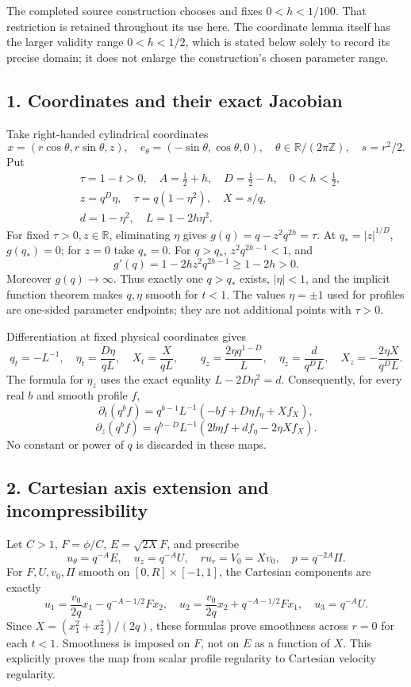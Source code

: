 \documentclass[10pt,a4paper]{article}
\begin{document}
The completed source construction chooses and fixes \(0<h<1/100\). That restriction is retained throughout its use here. The coordinate lemma itself has the larger validity range \(0<h<1/2\), which is stated below solely to record its precise domain; it does not enlarge the construction's chosen parameter range.

\subsection{1. Coordinates and their exact Jacobian}

Take right-handed cylindrical coordinates
\[
x=(r\cos\theta,r\sin\theta,z),\quad e_\theta=(-\sin\theta,\cos\theta,0),
\quad \theta\in\mathbb R/(2\pi\mathbb Z),\quad s=r^2/2.
\]
Put
\[
\begin{aligned}
&\tau=1-t>0,\quad A=\tfrac12+h,\quad D=\tfrac12-h,\quad 0<h<\tfrac12,\\
&z=q^D\eta,\quad \tau=q(1-\eta^2),\quad X=s/q,\\
&d=1-\eta^2,\quad L=1-2h\eta^2.
\end{aligned}
\]
For fixed \(\tau>0,z\in\mathbb R\), eliminating \(\eta\) gives
\(g(q)=q-z^2q^{2h}=\tau\). At \(q_*=|z|^{1/D}\), \(g(q_*)=0\); for \(z=0\) take \(q_*=0\). For \(q>q_*\), \(z^2q^{2h-1}<1\), and
\[
g'(q)=1-2hz^2q^{2h-1}\ge1-2h>0.
\]
Moreover \(g(q)\to\infty\). Thus exactly one \(q>q_*\) exists, \(|\eta|<1\), and the implicit function theorem makes \(q,\eta\) smooth for \(t<1\). The values \(\eta=\pm1\) used for profiles are one-sided parameter endpoints; they are not additional points with \(\tau>0\).

Differentiation at fixed physical coordinates gives
\[
q_t=-L^{-1},\quad \eta_t=\frac{D\eta}{qL},\quad X_t=\frac X{qL},
\qquad q_z=\frac{2\eta q^{1-D}}L,
\quad \eta_z=\frac d{q^DL},\quad X_z=-\frac{2\eta X}{q^DL}.
\]
The formula for \(\eta_z\) uses the exact equality \(L-2D\eta^2=d\). Consequently, for every real \(b\) and smooth profile \(f\),
\[
\partial_t(q^bf)=q^{b-1}L^{-1}(-bf+D\eta f_\eta+Xf_X),
\]
\[
\partial_z(q^bf)=q^{b-D}L^{-1}(2b\eta f+df_\eta-2\eta Xf_X).
\]
No constant or power of \(q\) is discarded in these maps.

\subsection{2. Cartesian axis extension and incompressibility}

Let \(C>1\), \(F=\phi/C\), \(E=\sqrt{2X}F\), and prescribe
\[
u_\theta=q^{-A}E,\quad u_z=q^{-A}U,\quad ru_r=V_0=Xv_0,
\quad p=q^{-2A}\Pi.
\]
For \(F,U,v_0,\Pi\) smooth on \([0,R]\times[-1,1]\), the Cartesian components are exactly
\[
u_1=\frac{v_0}{2q}x_1-q^{-A-1/2}Fx_2,
\quad u_2=\frac{v_0}{2q}x_2+q^{-A-1/2}Fx_1,
\quad u_3=q^{-A}U.
\]
Since \(X=(x_1^2+x_2^2)/(2q)\), these formulas prove smoothness across \(r=0\) for each \(t<1\). Smoothness is imposed on \(F\), not on \(E\) as a function of \(X\). This explicitly proves the map from scalar profile regularity to Cartesian velocity regularity.
\end{document}
